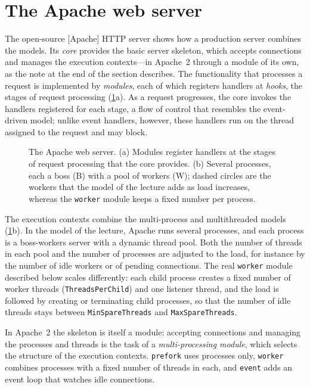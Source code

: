 \documentclass[../main.tex]{subfiles}
\begin{document}
\section{The Apache web server}
\label{sec:l06-apache}

The open-source [Apache] HTTP server shows how a production
server combines the models.  Its
\emph{core} provides the basic server skeleton, which accepts connections
and manages the execution contexts---in Apache~2 through a module of its
own, as the note at the end of the section describes.  The functionality
that processes a request is implemented by \emph{modules}, each of which
registers handlers at \emph{hooks}, the stages of request processing
(\cref{fig:l06-apache}a).  As a request
progresses, the core invokes the handlers registered for each stage, a flow
of control that resembles the event-driven model; unlike event handlers,
however, these handlers run on the thread assigned to the request and may
block.

\begin{figure}[htbp]
  \centering
  
  \caption{The Apache web server.  (a) Modules register handlers at the
    stages of request processing that the core provides.  (b) Several
    processes, each a boss (B) with a pool of workers (W); dashed circles are
    the workers that the model of the lecture adds as load increases,
    whereas the \texttt{worker} module keeps a fixed number per process.}
  \label{fig:l06-apache}
\end{figure}

The execution contexts combine the multi-process and multithreaded models
(\cref{fig:l06-apache}b).  In the model of the lecture, Apache runs several
processes, and each process is a boss-workers server with a dynamic thread
pool.  Both the number of threads in each pool and the number of processes
are adjusted to the load, for instance by the number of idle workers or of
pending connections.  The real \texttt{worker} module described below
scales differently: each child process creates a fixed number of worker
threads (\texttt{ThreadsPerChild}) and one listener thread, and the load is
followed by creating or terminating child processes, so that the number of
idle threads stays between \texttt{MinSpareThreads} and
\texttt{MaxSpareThreads}.

\begin{note}
  In Apache~2 the skeleton is itself a module: accepting connections and
  managing the processes and threads is the task of a
  \emph{multi-processing module}, which selects the structure of the
  execution contexts.  \texttt{prefork} uses processes only, \texttt{worker}
  combines processes with a fixed number of threads in each, and
  \texttt{event} adds an event loop that watches idle
  connections.
\end{note}
\end{document}
